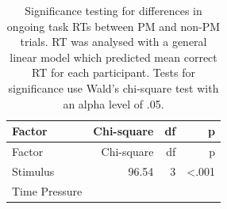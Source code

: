 \documentclass[11pt,]{article}
\begin{document}
\begin{longtable}[]{@{}lrrr@{}}
\caption{Significance testing for differences in ongoing task RTs
between PM and non-PM trials. RT was analysed with a general linear
model which predicted mean correct RT for each participant. Tests for
significance use Wald's chi-square test with an alpha level of
.05.}\tabularnewline
\toprule
\begin{minipage}[b]{0.32\columnwidth}\raggedright\strut
Factor\strut
\end{minipage} & \begin{minipage}[b]{0.16\columnwidth}\raggedleft\strut
Chi-square\strut
\end{minipage} & \begin{minipage}[b]{0.06\columnwidth}\raggedleft\strut
df\strut
\end{minipage} & \begin{minipage}[b]{0.06\columnwidth}\raggedleft\strut
p\strut
\end{minipage}\tabularnewline
\midrule
\endfirsthead
\toprule
\begin{minipage}[b]{0.32\columnwidth}\raggedright\strut
Factor\strut
\end{minipage} & \begin{minipage}[b]{0.16\columnwidth}\raggedleft\strut
Chi-square\strut
\end{minipage} & \begin{minipage}[b]{0.06\columnwidth}\raggedleft\strut
df\strut
\end{minipage} & \begin{minipage}[b]{0.06\columnwidth}\raggedleft\strut
p\strut
\end{minipage}\tabularnewline
\midrule
\endhead
\begin{minipage}[t]{0.32\columnwidth}\raggedright\strut
Stimulus\strut
\end{minipage} & \begin{minipage}[t]{0.16\columnwidth}\raggedleft\strut
96.54\strut
\end{minipage} & \begin{minipage}[t]{0.06\columnwidth}\raggedleft\strut
3\strut
\end{minipage} & \begin{minipage}[t]{0.06\columnwidth}\raggedleft\strut
\textless{}.001\strut
\end{minipage}\tabularnewline
\begin{minipage}[t]{0.32\columnwidth}\raggedright\strut
Time Pressure\strut
\end{minipage} & \begin{minipage}[t]{0.16\columnwidth}\raggedleft\strut

\end{minipage}
\end{longtable}
\end{document}
